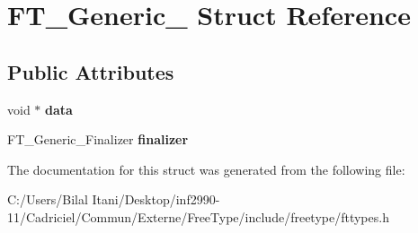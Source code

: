 \hypertarget{struct_f_t___generic__}{}\section{F\+T\+\_\+\+Generic\+\_\+ Struct Reference}
\label{struct_f_t___generic__}
\subsection*{Public Attributes}
\begin{DoxyCompactItemize}
\item 
void $\ast$ {\bfseries data}\hypertarget{struct_f_t___generic___af0bf8b983254b662f293e9a20505e27e}{}\label{struct_f_t___generic___af0bf8b983254b662f293e9a20505e27e}

\item 
F\+T\+\_\+\+Generic\+\_\+\+Finalizer {\bfseries finalizer}\hypertarget{struct_f_t___generic___a20fce8de90cc9e3876935817247b9ccc}{}\label{struct_f_t___generic___a20fce8de90cc9e3876935817247b9ccc}

\end{DoxyCompactItemize}


The documentation for this struct was generated from the following file\+:\begin{DoxyCompactItemize}
\item 
C\+:/\+Users/\+Bilal Itani/\+Desktop/inf2990-\/11/\+Cadriciel/\+Commun/\+Externe/\+Free\+Type/include/freetype/fttypes.\+h\end{DoxyCompactItemize}
